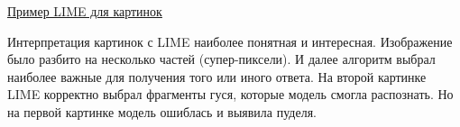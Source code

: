 \underline{Пример LIME для картинок} \cite{lime_dop}
\vspace{-3mm}

\begin{figure}[h]
\end{figure}

Интерпретация картинок с LIME наиболее понятная и интересная. Изображение было разбито на несколько частей (супер-пиксели). И далее алгоритм выбрал наиболее важные для получения того или иного ответа. На второй картинке LIME корректно выбрал фрагменты гуся, которые модель смогла распознать. Но на первой картинке модель ошиблась и выявила пуделя.